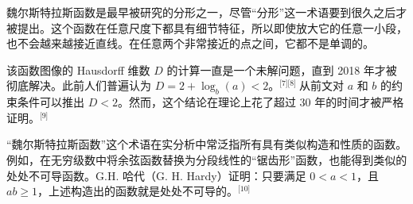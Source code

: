 魏尔斯特拉斯函数是最早被研究的分形之一，尽管“分形”这一术语要到很久之后才被提出。这个函数在任意尺度下都具有细节特征，所以即使放大它的任意一小段，也不会越来越接近直线。在任意两个非常接近的点之间，它都不是单调的。

该函数图像的 Hausdorff 维数 $D$ 的计算一直是一个未解问题，直到 2018 年才被彻底解决。此前人们普遍认为 $D = 2 + \log_b(a) < 2$。\(^\text{[7][8] }\)从前文对 $a$ 和 $b$ 的约束条件可以推出 $D < 2$。然而，这个结论在理论上花了超过 30 年的时间才被严格证明。\(^\text{[9]}\)

“魏尔斯特拉斯函数”这个术语在实分析中常泛指所有具有类似构造和性质的函数。例如，在无穷级数中将余弦函数替换为分段线性的“锯齿形”函数，也能得到类似的处处不可导函数。G.H. 哈代（G. H. Hardy）证明：只要满足 $0 < a < 1$，且 $ab \geq 1$，上述构造出的函数就是处处不可导的。\(^\text{[10]}\)
